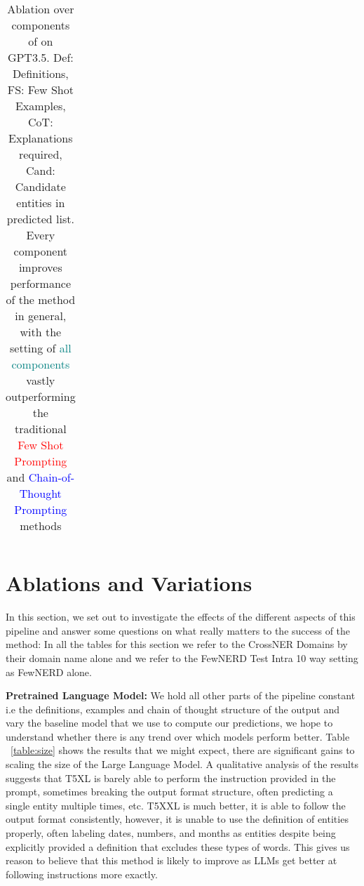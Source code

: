 \documentclass[11pt]{article}
\begin{document}
\begin{table*}[ht]
\begin{tabular}{|l|l|l|l|l|l|l|l|l|l|l|l||l|}
 \\\hline
\end{tabular}
\caption{Ablation over components of \toolname on GPT3.5. Def: Definitions, FS: Few Shot Examples, CoT: Explanations required, Cand: Candidate entities in predicted list. Every component improves performance of the method in general, with the setting of \textcolor{teal}{all components} vastly outperforming the traditional \textcolor{red}{Few Shot Prompting} and \textcolor{blue}{Chain-of-Thought Prompting} methods}
\label{table:gpt3_ablation}
\end{table*} 

\section{Ablations and Variations}
In this section, we set out to investigate the effects of the different aspects of this pipeline and answer some questions on what really matters to the success of the method: In all the tables for this section we refer to the CrossNER Domains by their domain name alone and we refer to the FewNERD Test Intra 10 way setting as FewNERD alone. 

\noindent\textbf{Pretrained Language Model:} We hold all other parts of the pipeline constant i.e the definitions, examples and chain of thought structure of the output and vary the baseline model that we use to compute our predictions, we hope to understand whether there is any trend over which models perform better. Table ~\ref{table:size} shows the results that we might expect, there are significant gains to scaling the size of the Large Language Model. A qualitative analysis of the results suggests that T5XL is barely able to perform the instruction provided in the prompt, sometimes breaking the output format structure, often predicting a single entity multiple times, etc. T5XXL is much better, it is able to follow the output format consistently, however, it is unable to use the definition of entities properly, often labeling dates, numbers, and months as entities despite being explicitly provided a definition that excludes these types of words. This gives us reason to believe that this method is likely to improve as LLMs get better at following instructions more exactly. 
\end{document}
